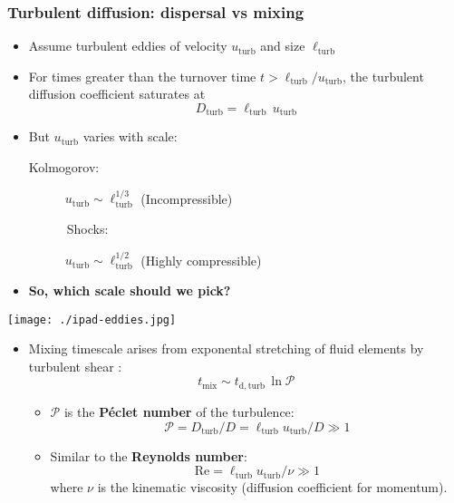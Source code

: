 \documentclass[presentation, compress]{beamer}
\providecommand{\alert}[1]{\textbf{#1}}
\newcommand\backskip{\vspace*{-\baselineskip}}
\begin{document}
\begin{frame}
  \frametitle{Turbulent diffusion: dispersal vs mixing}
  \begin{overprint}
    \begin{itemize}
    \item Assume turbulent eddies of velocity \(u_\mathrm{turb}\) and
      size \(\ell_\mathrm{turb}\)
    \item For times greater than the turnover time \(t >
      \ell_\mathrm{turb} / u_\mathrm{turb} \), the turbulent diffusion
      coefficient saturates at
      \[
      D_\mathrm{turb} = \ell_\mathrm{turb}\, u_\mathrm{turb}
      \]
      \backskip
    \item But \(u_\mathrm{turb}\) varies with scale:
      \begin{description}
      \item[Kolmogorov:] \( u_\mathrm{turb} \sim \ell_\mathrm{turb}^{1/3} \) (Incompressible)
        \smallskip
      \item[\ \ \ \ \ \ Shocks:] \( u_\mathrm{turb} \sim \ell_\mathrm{turb}^{1/2} \) (Highly compressible)
      \end{description}
      \smallskip
    \item \alert{So, which scale should we pick?}
    \end{itemize}
    \centering\null
    \texttt{[image: ./ipad-eddies.jpg]}

    \begin{itemize}
    \item Mixing timescale arises from exponental stretching of fluid elements by turbulent shear : 
      \[
      t_\mathrm{mix} \sim t_\mathrm{d, turb} \, \ln \mathcal{P}
      \]
      \backskip
      \begin{itemize}
      \item \(\mathcal{P}\) is the \alert{Péclet number} of the
        turbulence:
        \[
        \mathcal{P} = D_\mathrm{turb} / D = \ell_\mathrm{turb}
        u_\mathrm{turb} / D \gg 1
        \]
        \backskip
      \item Similar to the \alert{Reynolds number}:
        \[
        \mathrm{Re} = \ell_\mathrm{turb} u_\mathrm{turb} / \nu \gg 1
        \]
        where \(\nu\) is the kinematic viscosity (diffusion
        coefficient for momentum).
      \end{itemize}
    \end{itemize}
  \end{overprint}
\end{frame}
\end{document}
